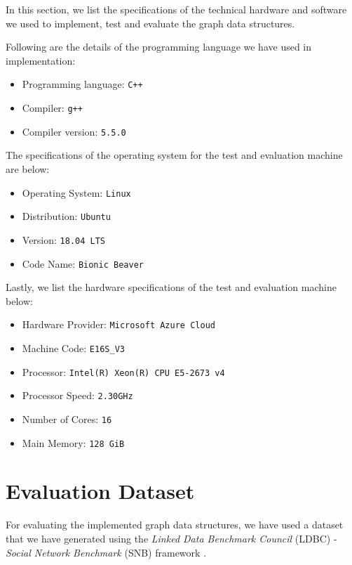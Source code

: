 {In this section, we list the specifications of the technical hardware and software we used to implement, test and evaluate the graph data structures.

Following are the details of the programming language we have used in implementation:

\begin{itemize}
\item Programming language: \texttt{C++}
\item Compiler: \texttt{g++}
\item Compiler version: \texttt{5.5.0}
\end{itemize}

The specifications of the operating system for the test and evaluation machine are below:

\begin{itemize}
\item Operating System: \texttt{Linux}
\item Distribution: \texttt{Ubuntu}
\item Version: \texttt{18.04 LTS}
\item Code Name: \texttt{Bionic Beaver}
\end{itemize}

Lastly, we list the hardware specifications of the test and evaluation machine below:

\begin{itemize}
\item Hardware Provider: \texttt{Microsoft Azure Cloud}
\item Machine Code: \texttt{E16S\_V3}
\item Processor: \texttt{Intel(R) Xeon(R) CPU E5-2673 v4}
\item Processor Speed: \texttt{2.30GHz}
\item Number of Cores: \texttt{16}
\item Main Memory: \texttt{128 GiB}
\end{itemize}

\section{Evaluation Dataset}
\label{sec:dataset}

For evaluating the implemented graph data structures, we have used a dataset that we have generated using the \textit{Linked Data Benchmark Council} (LDBC) - \textit{Social Network Benchmark} (SNB) framework \cite{boncz2013ldbc, prat2017ldbc}.

}
